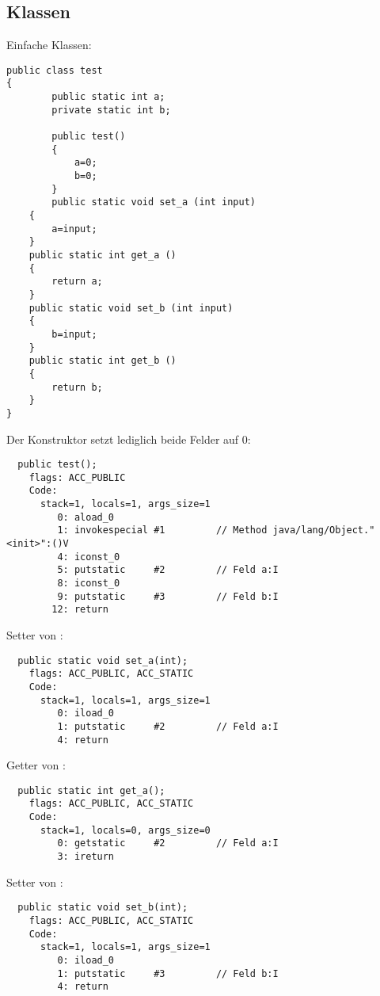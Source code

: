\subsection{Klassen}

Einfache Klassen:

\begin{lstlisting}[caption=test.java,style=customjava]
public class test
{
        public static int a;
        private static int b;

        public test()
        {
            a=0;
            b=0;
        }
        public static void set_a (int input)
	{
		a=input;
	}
	public static int get_a ()
	{
		return a;
	}
	public static void set_b (int input)
	{
		b=input;
	}
	public static int get_b ()
	{
		return b;
	}
}
\end{lstlisting}

Der Konstruktor setzt lediglich beide Felder auf 0:

\begin{lstlisting}
  public test();
    flags: ACC_PUBLIC
    Code:
      stack=1, locals=1, args_size=1
         0: aload_0       
         1: invokespecial #1         // Method java/lang/Object."<init>":()V
         4: iconst_0      
         5: putstatic     #2         // Feld a:I
         8: iconst_0      
         9: putstatic     #3         // Feld b:I
        12: return        
\end{lstlisting}

Setter von :

\begin{lstlisting}
  public static void set_a(int);
    flags: ACC_PUBLIC, ACC_STATIC
    Code:
      stack=1, locals=1, args_size=1
         0: iload_0       
         1: putstatic     #2         // Feld a:I
         4: return        
\end{lstlisting}

Getter von :

\begin{lstlisting}
  public static int get_a();
    flags: ACC_PUBLIC, ACC_STATIC
    Code:
      stack=1, locals=0, args_size=0
         0: getstatic     #2         // Feld a:I
         3: ireturn       
\end{lstlisting}

Setter von :

\begin{lstlisting}
  public static void set_b(int);
    flags: ACC_PUBLIC, ACC_STATIC
    Code:
      stack=1, locals=1, args_size=1
         0: iload_0       
         1: putstatic     #3         // Feld b:I
         4: return        
\end{lstlisting}

